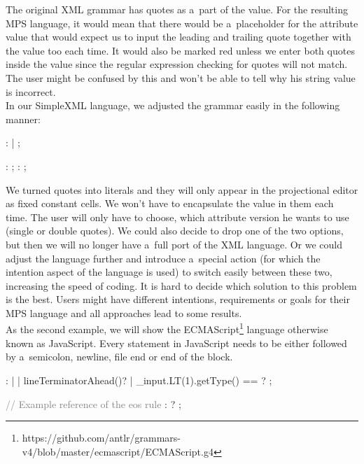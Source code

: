 The original XML grammar has quotes as a~part of the value.
For the resulting MPS language, it would mean that there would be a~placeholder for the attribute value that would expect us to input the leading and trailing quote together with the value too each time.
It would also be marked red unless we enter both quotes inside the value since the regular expression checking for quotes will not match.
The user might be confused by this and won't be able to tell why his string value is incorrect.
\\

In our SimpleXML language, we adjusted the grammar easily in the following manner:

\begin{antlr}
	   :      
	            |      
	            ;

	       :   \regex{~["]*} ;
	       :   \regex{~[']*} ;
\end{antlr}

We turned quotes into literals and they will only appear in the projectional editor as fixed constant cells.
We won't have to encapsulate the value in them each time.
The user will only have to choose, which attribute version he wants to use (single or double quotes).
We could also decide to drop one of the two options, but then we will no longer have a~full port of the XML language.
Or we could adjust the language further and introduce a~special action (for which the intention aspect of the language is used) to switch easily between these two, increasing the speed of coding.
It is hard to decide which solution to this problem is the best.
Users might have different intentions, requirements or goals for their MPS language and all approaches lead to some results.
\\

As the second example, we will show the ECMAScript\footnote{https://github.com/antlr/grammars-v4/blob/master/ecmascript/ECMAScript.g4} language otherwise known as JavaScript.
Every statement in JavaScript needs to be either followed by a~semicolon, newline, file end or end of the block.

\begin{antlr}
	            : 
	               | 
	               | {lineTerminatorAhead()}?
	               | {{\_}input.LT(1).getType() == }?
	               ;

	\textcolor{gray}{// Example reference of the eos rule}
	 :  ? 
	               ;
\end{antlr}

